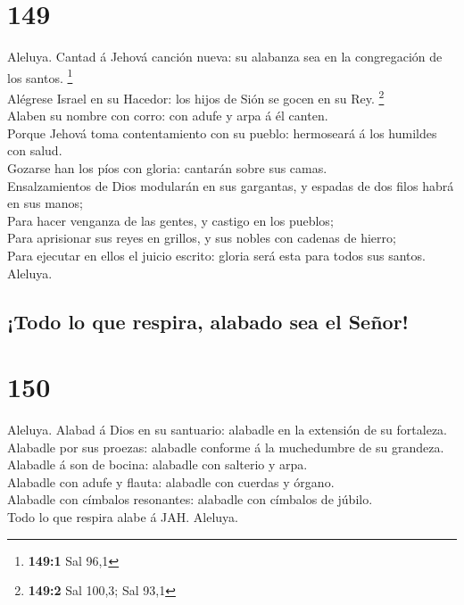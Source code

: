 \hypertarget{section-148}{%
\section{149}\label{section-148}}

 Aleluya. Cantad á Jehová canción nueva: su alabanza sea en
la congregación de los santos. \footnote{\textbf{149:1} Sal 96,1}\\
 Alégrese Israel en su Hacedor: los hijos de Sión se gocen
en su Rey. \footnote{\textbf{149:2} Sal 100,3; Sal 93,1}\\
 Alaben su nombre con corro: con adufe y arpa á él canten.\\
 Porque Jehová toma contentamiento con su pueblo: hermoseará
á los humildes con salud.\\
 Gozarse han los píos con gloria: cantarán sobre sus
camas.\\
 Ensalzamientos de Dios modularán en sus gargantas, y
espadas de dos filos habrá en sus manos;\\
 Para hacer venganza de las gentes, y castigo en los
pueblos;\\
 Para aprisionar sus reyes en grillos, y sus nobles con
cadenas de hierro;\\
 Para ejecutar en ellos el juicio escrito: gloria será esta
para todos sus santos. Aleluya.

\hypertarget{todo-lo-que-respira-alabado-sea-el-seuxf1or}{%
\subsection{¡Todo lo que respira, alabado sea el
Señor!}\label{todo-lo-que-respira-alabado-sea-el-seuxf1or}}

\hypertarget{section-149}{%
\section{150}\label{section-149}}

 Aleluya. Alabad á Dios en su santuario: alabadle en la
extensión de su fortaleza.\\
 Alabadle por sus proezas: alabadle conforme á la
muchedumbre de su grandeza.\\
 Alabadle á son de bocina: alabadle con salterio y arpa.\\
 Alabadle con adufe y flauta: alabadle con cuerdas y
órgano.\\
 Alabadle con címbalos resonantes: alabadle con címbalos de
júbilo.\\
 Todo lo que respira alabe á JAH. Aleluya.

